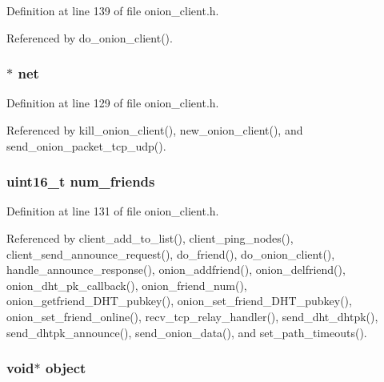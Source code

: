 Definition at line 139 of file onion\+\_\+client.\+h.



Referenced by do\+\_\+onion\+\_\+client().

\hypertarget{struct_onion___client_aa14ea2f67950f57fe4235d7375a2216c}{
\subsubsection[{net}]{$\ast$ net}}\label{struct_onion___client_aa14ea2f67950f57fe4235d7375a2216c}


Definition at line 129 of file onion\+\_\+client.\+h.



Referenced by kill\+\_\+onion\+\_\+client(), new\+\_\+onion\+\_\+client(), and send\+\_\+onion\+\_\+packet\+\_\+tcp\+\_\+udp().

\hypertarget{struct_onion___client_a8ee1f2d7e543bce350c591a8eaac0cf8}{
\subsubsection[{num\+\_\+friends}]{\setlength{\rightskip}{0pt plus 5cm}uint16\+\_\+t num\+\_\+friends}}\label{struct_onion___client_a8ee1f2d7e543bce350c591a8eaac0cf8}


Definition at line 131 of file onion\+\_\+client.\+h.



Referenced by client\+\_\+add\+\_\+to\+\_\+list(), client\+\_\+ping\+\_\+nodes(), client\+\_\+send\+\_\+announce\+\_\+request(), do\+\_\+friend(), do\+\_\+onion\+\_\+client(), handle\+\_\+announce\+\_\+response(), onion\+\_\+addfriend(), onion\+\_\+delfriend(), onion\+\_\+dht\+\_\+pk\+\_\+callback(), onion\+\_\+friend\+\_\+num(), onion\+\_\+getfriend\+\_\+\+D\+H\+T\+\_\+pubkey(), onion\+\_\+set\+\_\+friend\+\_\+\+D\+H\+T\+\_\+pubkey(), onion\+\_\+set\+\_\+friend\+\_\+online(), recv\+\_\+tcp\+\_\+relay\+\_\+handler(), send\+\_\+dht\+\_\+dhtpk(), send\+\_\+dhtpk\+\_\+announce(), send\+\_\+onion\+\_\+data(), and set\+\_\+path\+\_\+timeouts().

\hypertarget{struct_onion___client_a077376d12464f945e2414d5499c79b3f}{
\subsubsection[{object}]{\setlength{\rightskip}{0pt plus 5cm}void$\ast$ object}}\label{struct_onion___client_a077376d12464f945e2414d5499c79b3f}


